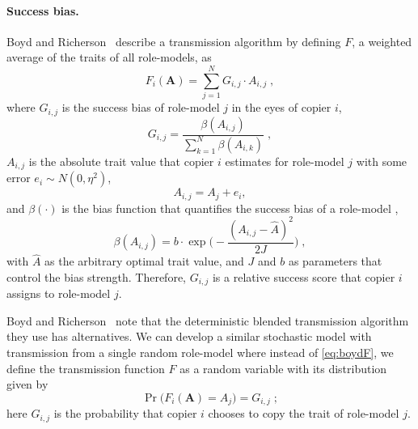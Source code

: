 \documentclass[12pt]{extarticle}
\let\vec\mathbf
\begin{document}
\paragraph{Success bias.}
Boyd and Richerson~\citep[Ch.~8, p.~247-249]{evolutionBook} describe a  transmission algorithm by defining $F$, a weighted average of the traits of all role-models, as
\begin{equation}\label{eq:boydF}
F_i(\vec{A}) = \sum_{j=1}^N G_{i,j}\cdot A_{i,j} \;, 
\end{equation}
where $G_{i,j}$ is the success bias of role-model $j$ in the eyes of copier $i$,
\begin{equation}\label{eq:boydG}
G_{i,j} = \frac{\beta(A_{i,j})}{\sum_{k=1}^{N} \beta(A_{i,k})} \;,
\end{equation}
$A_{i,j}$ is the absolute trait value {that} copier $i$ estimates for role-model $j$ with some error $e_i \sim N(0,\eta^2)$,
\begin{equation}\label{eq:relativeTrait}
A_{i,j} = A_j + e_i,
\end{equation}
and $\beta(\cdot)$ is the bias function that quantifies the success bias of a role-model \citep[eq.~5.11]{evolutionBook},
\begin{equation}\label{eq:success_bias}
\beta(A_{i,j}) = b \cdot \exp{\Big(-\frac{(A_{i,j} - \hat{A})^2}{2J}\Big)} \;,
\end{equation} 
with $\hat{A}$ as the arbitrary optimal trait value, and $J$ and $b$ as parameters that control the bias strength.
Therefore, $G_{i,j}$ is a relative success score that copier $i$ assigns to role-model $j$.

Boyd and Richerson~\citep{evolutionBook} note that the deterministic blended transmission algorithm they use has alternatives. We {can} develop a similar stochastic model with transmission from a single random role-model where instead of \cref{eq:boydF}, we define the transmission function $F$ as a random variable with its distribution given by 
\begin{equation}\label{eq:ourF}
\Pr\big(F_i(\vec{A}) = A_{j}\big) = G_{i,j} \;;
\end{equation}
{here $G_{i,j}$ is} the probability {that copier $i$ chooses} to copy the trait of role-model $j$.
\end{document}
